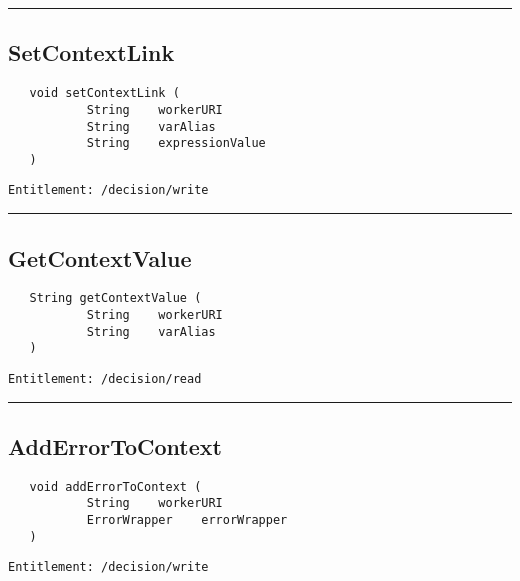 \rule{12cm}{2pt}
\subsection{SetContextLink}
\label{Api:SetContextLink}
\begin{Verbatim}
   void setContextLink (
           String    workerURI
           String    varAlias
           String    expressionValue
   )
\end{Verbatim}
\begin{Verbatim}[formatcom=\color{Maroon}]
  Entitlement: /decision/write
\end{Verbatim}



\rule{12cm}{2pt}
\subsection{GetContextValue}
\label{Api:GetContextValue}
\begin{Verbatim}
   String getContextValue (
           String    workerURI
           String    varAlias
   )
\end{Verbatim}
\begin{Verbatim}[formatcom=\color{Maroon}]
  Entitlement: /decision/read
\end{Verbatim}



\rule{12cm}{2pt}
\subsection{AddErrorToContext}
\label{Api:AddErrorToContext}
\begin{Verbatim}
   void addErrorToContext (
           String    workerURI
           ErrorWrapper    errorWrapper
   )
\end{Verbatim}
\begin{Verbatim}[formatcom=\color{Maroon}]
  Entitlement: /decision/write
\end{Verbatim}



